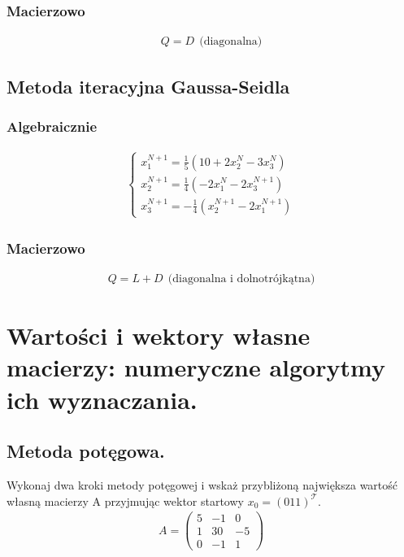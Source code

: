 \documentclass[12pt]{article}
\begin{document}
    \subsubsection{Macierzowo}
    \begin{align*}
        Q = D ~~ \text{(diagonalna)}
    \end{align*}

    \subsection{Metoda iteracyjna Gaussa-Seidla}
    \subsubsection{Algebraicznie}
    \begin{align*}
        \left\{\begin{matrix}
                   x^{N+1}_1 = \frac{1}{5}(10 + 2x^N_2 - 3x^N_3)\\
                   x^{N+1}_2 = \frac{1}{4}(-2x^N_1 - 2x^{N+1}_3)\\
                   x^{N+1}_3 = -\frac{1}{4}(x^{N+1}_2 - 2x^{N+1}_1)
        \end{matrix}\right.
    \end{align*}

    \subsubsection{Macierzowo}
    \begin{align*}
        Q = L + D ~~ \text{(diagonalna i dolnotrójkątna)}
    \end{align*}


    \newpage

    \section{Wartości i wektory własne macierzy: numeryczne algorytmy ich wyznaczania.}

    \subsection{Metoda potęgowa.}

    \begin{exercise}
        Wykonaj dwa kroki metody potęgowej i wskaż przybliżoną największa wartość własną macierzy A przyjmując
        wektor startowy $x_0 = (0 1 1)^\mathcal{T}$.
        \begin{align*}
            A = \begin{pmatrix}
                5 & -1 & 0\\
                1 & 30 & -5\\
                0 & -1 & 1
            \end{pmatrix}
        \end{align*}
    \end{exercise}
\end{document}
